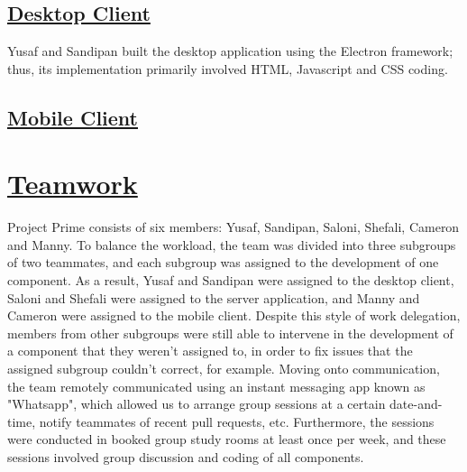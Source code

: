 \documentclass{article}
\begin{document}
\subsection{\underline{Desktop Client}}
Yusaf and Sandipan built the desktop application using the Electron framework; thus, its implementation primarily involved HTML, Javascript and CSS coding.

\subsection{\underline{Mobile Client}}

\section{\underline{Teamwork}}
Project Prime consists of six members: Yusaf, Sandipan, Saloni, Shefali, Cameron and Manny. To balance the workload, the team was divided into three subgroups of two teammates, and each subgroup was assigned to the development of one component. As a result, Yusaf and Sandipan were assigned to the desktop client, Saloni and Shefali were assigned to the server application, and Manny and Cameron were assigned to the mobile client. Despite this style of work delegation, members from other subgroups were still able to intervene in the development of a component that they weren't assigned to, in order to fix issues that the assigned subgroup couldn't correct, for example. Moving onto communication, the team remotely communicated using an instant messaging app known as "Whatsapp", which allowed us to arrange group sessions at a certain date-and-time, notify teammates of recent pull requests, etc. Furthermore, the sessions were conducted in booked group study rooms at least once per week, and these sessions involved group discussion and coding of all components. 
\end{document}

